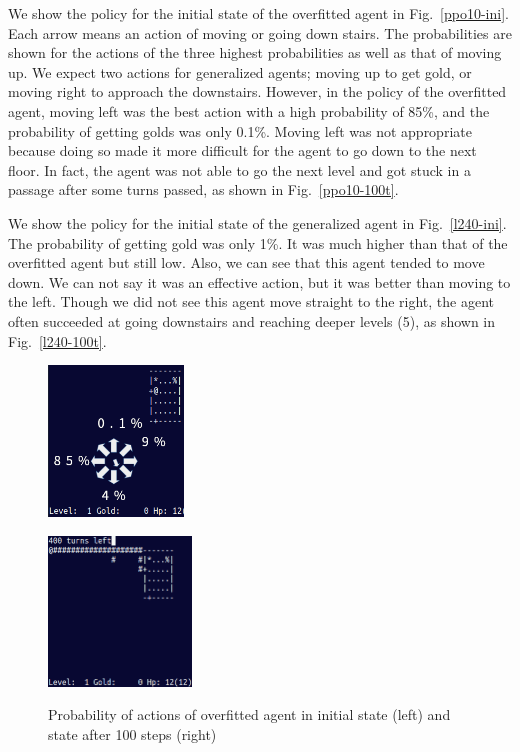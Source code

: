 \documentclass[conference]{IEEEtran}
\begin{document}
We show the policy for the initial state of the overfitted agent in
Fig.~\ref{ppo10-ini}. 
Each arrow means an action of moving or going down stairs.
The probabilities are shown for the actions of the three highest
probabilities as well as that of moving up.
We expect two actions for generalized agents;
moving up to get gold, or moving right to approach the downstairs.
However, in the policy of the overfitted agent, moving left was the best
action with a high probability of 85\%, and the probability of getting
golds was only 0.1\%.
Moving left was not appropriate because doing so made it more difficult
for the agent to go down to the next floor.
In fact, the agent was not able to go the next level and got stuck in
a passage after some turns passed, as shown in
Fig.~\ref{ppo10-100t}. \par
We show the policy for the initial state of the generalized agent in
Fig.~\ref{l240-ini}.
The probability of getting gold was only 1\%.
It was much higher than that of the overfitted agent but still low.
Also, we can see that this agent tended to move down.
We can not say it was an effective action, but it was better than moving
to the left.
Though we did not see this agent move straight to the right, the
agent often succeeded at going downstairs and reaching deeper levels (5), as
shown in Fig.~\ref{l240-100t}.

\begin{figure}[t]
 \centering
  \begin{minipage}[cbt]{3.6cm}
   \centering
   \includegraphics[width=3.6cm]{pictures/init-raw-10.png}
    \label{ppo10-ini}
  \end{minipage}
  \begin{minipage}[cbt]{3.8cm}
   \centering
   \includegraphics[width=3.8cm]{pictures/t400-raw10.png}
    \label{ppo10-100t}
  \end{minipage}
 \caption{Probability of actions of overfitted agent in
   initial state (left) and state after 100 steps (right)} \label{ppo10-act}
\end{figure}
\end{document}

